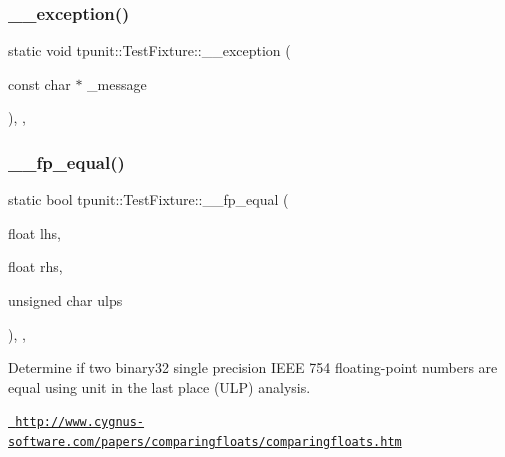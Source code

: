 \mbox{\label{classtpunit_1_1TestFixture_a1c444e5d0d3ad5f48b77dce26551ca9e}} 
\subsubsection{\texorpdfstring{\_\_exception()}{\_\_exception()}}
{\footnotesize\ttfamily static void tpunit\+::\+Test\+Fixture\+::\+\_\+\+\_\+exception (\begin{DoxyParamCaption}\item[{const char $\ast$}]{\+\_\+message }\end{DoxyParamCaption})\hspace{0.3cm}{\ttfamily [inline]}, {\ttfamily [static]}, {\ttfamily [protected]}}

\mbox{\label{classtpunit_1_1TestFixture_aa20959e2ba54953d3af60271ce416245}} 
\subsubsection{\texorpdfstring{\_\_fp\_equal()}{\_\_fp\_equal()}\hspace{0.1cm}{\footnotesize\ttfamily [1/2]}}
{\footnotesize\ttfamily static bool tpunit\+::\+Test\+Fixture\+::\+\_\+\+\_\+fp\+\_\+equal (\begin{DoxyParamCaption}\item[{float}]{lhs,  }\item[{float}]{rhs,  }\item[{unsigned char}]{ulps }\end{DoxyParamCaption})\hspace{0.3cm}{\ttfamily [inline]}, {\ttfamily [static]}, {\ttfamily [protected]}}



Determine if two binary32 single precision I\+E\+EE 754 floating-\/point numbers are equal using unit in the last place (U\+LP) analysis. 

\href{http://www.cygnus-software.com/papers/comparingfloats/comparingfloats.htm}{\texttt{ http\+://www.\+cygnus-\/software.\+com/papers/comparingfloats/comparingfloats.\+htm}} \mbox{\label{classtpunit_1_1TestFixture_a123835a9d71498b0f1b3d92a4f5b3c2b}} 
